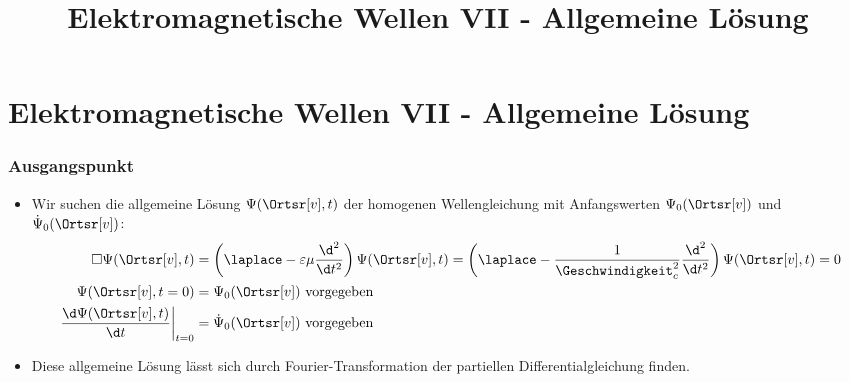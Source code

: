 
 \usetikzlibrary{overlay-beamer-styles}
  
\title[TET: Elektromagnetische Wellen VII - Allgemeine Lösung]{Elektromagnetische Wellen VII - Allgemeine Lösung}


% 
% 

\maketitle

% 
% 
\section{Elektromagnetische Wellen VII - Allgemeine Lösung}

\begin{frame}
  \frametitle{Ausgangspunkt}
  \begin{itemize}[<+->]
  \item Wir suchen die \alert{allgemeine Lösung} \(\Psi(\Ortsr[v],t)\) der \alert{homogenen Wellengleichung} mit \alert{Anfangswerten} \(\Psi_0(\Ortsr[v])\) und \(\dot{\Psi}_0(\Ortsr[v])\):
    \begin{align*}
      \square\Psi(\Ortsr[v],t) &= \left(\laplace - \varepsilon\mu\frac{\d^2}{\d t^2}\right)\Psi(\Ortsr[v],t) = \left(\laplace - \frac{1}{\Geschwindigkeit_c^2}\frac{\d^2}{\d t^2}\right)\Psi(\Ortsr[v],t) = 0\\
      \Psi(\Ortsr[v],t=0) &= \Psi_0(\Ortsr[v]) \text{ vorgegeben}\\
      \left.\frac{\d \Psi(\Ortsr[v],t)}{\d t}\right|_{t=0} &= \dot{\Psi}_0(\Ortsr[v]) \text{ vorgegeben}
    \end{align*}
  \item Diese allgemeine Lösung lässt sich durch \alert{Fourier-Transformation} der partiellen Differentialgleichung finden.
    \end{itemize}
  \end{frame}


